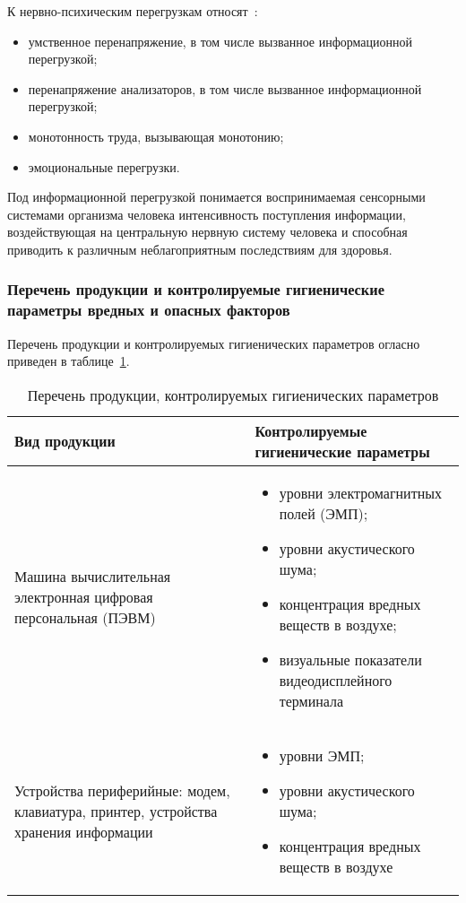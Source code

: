 К нервно-психическим перегрузкам относят~\cite{gost_12.0.003-2015}:
\begin{itemize}
 \item умственное перенапряжение, в том числе вызванное информационной перегрузкой;
 \item перенапряжение анализаторов, в том числе вызванное информационной перегрузкой;
 \item монотонность труда, вызывающая монотонию;
 \item эмоциональные перегрузки.
\end{itemize}

Под информационной перегрузкой понимается воспринимаемая сенсорными системами организма
человека интенсивность поступления информации, воздействующая на центральную нервную систему человека
и способная приводить к различным неблагоприятным последствиям для здоровья.

\subsubsection{Перечень продукции и контролируемые гигиенические параметры вредных и опасных факторов}

Перечень продукции и контролируемых гигиенических параметров огласно~\cite{sanpin_2.4.1340-03} 
приведен в таблице~\ref{tab:life_1}.

\begin{table}[h!]
\caption{ Перечень продукции, контролируемых гигиенических параметров }
\label{tab:life_1}
\begin{center}
\begin{tabularx}{\linewidth}{|X|X|}
\hline
Вид продукции & Контролируемые гигиенические параметры\\
\hline
\item Машина вычислительная электронная цифровая персональная (ПЭВМ) & 
\begin{itemize}
 \item уровни электромагнитных полей (ЭМП);
 \item уровни акустического шума;
 \item концентрация вредных веществ в воздухе;
 \item визуальные показатели видеодисплейного терминала
\end{itemize}									     
\\
\hline
\item Устройства периферийные: модем, клавиатура, принтер, устройства хранения информации & 
\begin{itemize}
 \item уровни ЭМП;
 \item уровни акустического шума;
 \item концентрация вредных веществ в воздухе
\end{itemize}
 \\
\hline
\end{tabularx}
\end{center}
\end{table}




